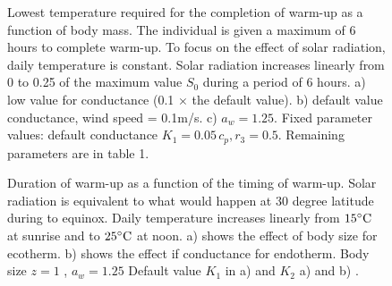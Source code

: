 %
\begin{figure}[H]
\begin{center}
\caption{
	Lowest temperature required for the completion of warm-up as a function of body mass.
	The individual is given a maximum of 6 hours to complete warm-up.
	To focus on the effect of solar radiation, daily temperature is constant.
	Solar radiation increases linearly from 0 to 0.25 of the maximum value $S_0$ during a period of 6 hours. 
	a)  low value for conductance (0.1 $\times$ the default value).
	b) default value conductance, wind speed  = 0.1m/s.
	c)  $a_w = 1.25$. 
	Fixed parameter values: default conductance $K_1 = 0.05 \, c_p, r_3 = 0.5$.
	Remaining parameters are in table 1.
}%
\label{fig4}
\end{center}
\end{figure}
%
\begin{figure}[H]
\begin{center}
\caption{
	Duration of warm-up as a function of the timing of warm-up.
	Solar radiation is equivalent to what would happen at 30 degree latitude during to equinox.
	Daily temperature increases  linearly from $15^{\circ}\rm{C}$ at sunrise and to $25^{\circ}\rm{C}$ at noon.
	a) shows the effect of body size for ecotherm.
	b)  shows the effect if conductance for endotherm. Body size $z = 1$ , $a_w = 1.25$
	Default value $K_1$ in a) and $K_2$ a) and b) .	
}%
\label{fig5}
\end{center}
\end{figure}
